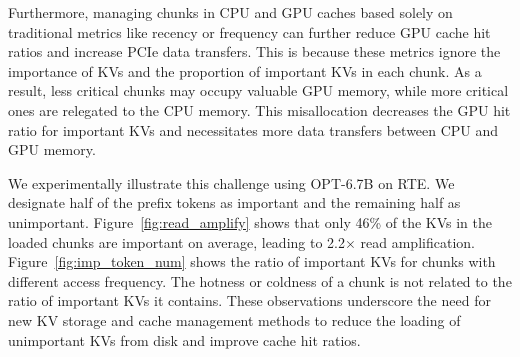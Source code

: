 Furthermore, managing chunks in CPU and GPU caches based solely on traditional
metrics like recency or frequency can further reduce GPU cache hit ratios and
increase PCIe data transfers. This is because these metrics ignore the
importance of KVs and the proportion of important KVs in each chunk. As a
result, less critical chunks may occupy valuable GPU memory, while more critical
ones are relegated to the CPU memory. This misallocation decreases the GPU hit ratio
for important KVs and necessitates more data transfers between CPU and GPU memory.


We experimentally illustrate this challenge using OPT-6.7B on RTE. 
We designate half of the prefix tokens as important and the remaining half as unimportant.
Figure~\ref{fig:read_amplify} shows 
that only 46\% of the KVs in the 
loaded chunks are important on average, leading to 2.2$\times$ read amplification. 
Figure~\ref{fig:imp_token_num} shows the ratio of important KVs for chunks with different access 
frequency. The hotness or coldness of a chunk is not related to the 
ratio of important KVs it contains. These observations 
underscore the need for new KV storage and cache management methods to reduce 
the loading of unimportant KVs from disk and improve cache hit ratios.
